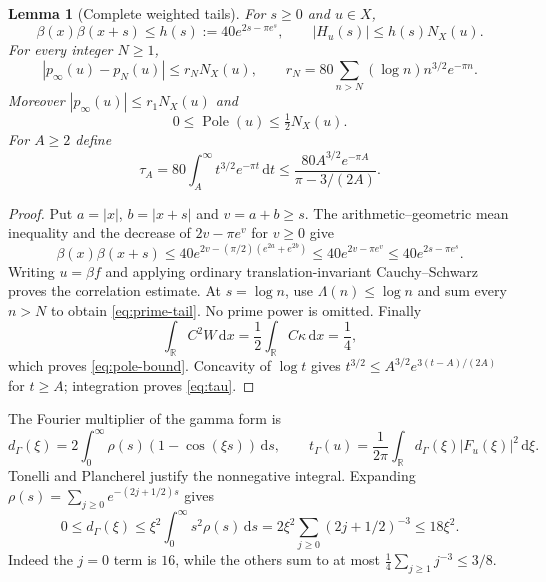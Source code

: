 \documentclass[11pt]{article}
\newtheorem{lemma}[theorem]{Lemma}
\theoremstyle{remark}\newtheorem{remark}[theorem]{Remark}
\newcommand{\R}{\mathbb R}
\newcommand{\dd}{\,\mathrm d}
\newcommand{\Pole}{\operatorname{Pole}}
\numberwithin{equation}{section}
\begin{document}
\begin{lemma}[Complete weighted tails]\label{lem:tails}
For $s\ge0$ and $u\in X$,
\begin{equation}\label{eq:overlap}
 \beta(x)\beta(x+s)\le h(s):=40e^{2s-\pi e^s},\qquad
 |H_u(s)|\le h(s)N_X(u).
\end{equation}
For every integer $N\ge1$,
\begin{equation}\label{eq:prime-tail}
 |p_\infty(u)-p_N(u)|\le r_NN_X(u),\qquad
 r_N=80\sum_{n>N}(\log n)n^{3/2}e^{-\pi n}.
\end{equation}
Moreover $|p_\infty(u)|\le r_1N_X(u)$ and
\begin{equation}\label{eq:pole-bound}
 0\le\Pole(u)\le\tfrac12N_X(u).
\end{equation}
For $A\ge2$ define
\begin{equation}\label{eq:tau}
 \tau_A=80\int_A^\infty t^{3/2}e^{-\pi t}\dd t
 \le\frac{80A^{3/2}e^{-\pi A}}{\pi-3/(2A)}.
\end{equation}
\end{lemma}
\begin{proof}
Put $a=|x|$, $b=|x+s|$ and $v=a+b\ge s$. The arithmetic--geometric
mean inequality and the decrease of $2v-\pi e^v$ for $v\ge0$ give
\[
 \beta(x)\beta(x+s)
 \le40e^{2v-(\pi/2)(e^{2a}+e^{2b})}
 \le40e^{2v-\pi e^v}\le40e^{2s-\pi e^s}.
\]
Writing $u=\beta f$ and applying ordinary translation-invariant
Cauchy--Schwarz proves the correlation estimate. At $s=\log n$, use
$\Lambda(n)\le\log n$ and sum every $n>N$ to obtain
\eqref{eq:prime-tail}. No prime power is omitted. Finally
\[
 \int_\R C^2W\dd x=\frac12\int_\R C\kappa\dd x=\frac14,
\]
which proves \eqref{eq:pole-bound}. Concavity of $\log t$ gives
$t^{3/2}\le A^{3/2}e^{3(t-A)/(2A)}$ for $t\ge A$; integration proves
\eqref{eq:tau}.
\end{proof}

The Fourier multiplier of the gamma form is
\begin{equation}\label{eq:d-gamma}
 d_\Gamma(\xi)=2\int_0^\infty\rho(s)(1-\cos(\xi s))\dd s,
 \qquad t_\Gamma(u)=\frac1{2\pi}\int_\R d_\Gamma(\xi)|F_u(\xi)|^2\dd\xi.
\end{equation}
Tonelli and Plancherel justify the nonnegative integral. Expanding
$\rho(s)=\sum_{j\ge0}e^{-(2j+1/2)s}$ gives
\[
 0\le d_\Gamma(\xi)\le\xi^2\int_0^\infty s^2\rho(s)\dd s
 =2\xi^2\sum_{j\ge0}(2j+1/2)^{-3}\le18\xi^2.
\]
Indeed the $j=0$ term is $16$, while the others sum to at most
$\frac14\sum_{j\ge1}j^{-3}\le3/8$.
\end{document}
